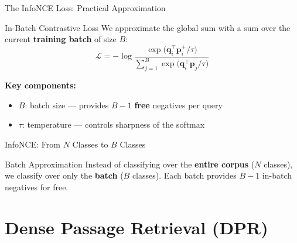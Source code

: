 \documentclass[aspectratio=169]{beamer}
\newif\ifanimated
\newcommand{\cpause}{\ifanimated\pause\fi}
\newcommand{\vq}{\mathbf{q}}
\newcommand{\vp}{\mathbf{p}}
\begin{document}
\begin{frame}[shrink=10]{The InfoNCE Loss: Practical Approximation}
\begin{block}{In-Batch Contrastive Loss}
We approximate the global sum with a sum over the current \textbf{training batch} of size $B$:
$$\mathcal{L} = -\log \frac{\exp\!\bigl(\vq_i^\top \vp_i^+ / \tau\bigr)}{\displaystyle\sum_{j=1}^{B} \exp\!\bigl(\vq_i^\top \vp_j / \tau\bigr)}$$
\end{block}

\cpause
\vspace{0.3em}

\textbf{Key components:}
\begin{itemize}
    \item $B$: batch size --- provides $B-1$ \textbf{free} negatives per query
    \item $\tau$: temperature --- controls sharpness of the softmax
\end{itemize}
\end{frame}

\begin{frame}[shrink=20]{InfoNCE: From $N$ Classes to $B$ Classes}
\begin{center}

\end{center}

\begin{exampleblock}{Batch Approximation}
Instead of classifying over the \textbf{entire corpus} ($N$ classes), we classify over only the \textbf{batch} ($B$ classes). Each batch provides $B{-}1$ in-batch negatives for free.
\end{exampleblock}
\end{frame}


\section{Dense Passage Retrieval (DPR)}

\begin{frame}[plain]
\sectionpage
\end{frame}
\end{document}
